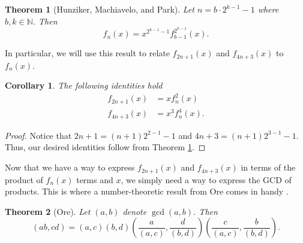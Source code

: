 \documentclass[a4paper]{article}
\newtheorem{theorem}{Theorem}
\newtheorem{corollary}{Corollary}
\newcommand{\N}{\mathbb{N}}
\begin{document}
	\begin{theorem}[Hunziker, Machiavelo, and Park]\label{HMP_identity}
		Let $n = b\cdot2^{k-1} - 1$ where $b, k \in \N$.
		Then
		\begin{equation*}
			f_n(x) = x^{2^{k-1}-1} f_{b-1}^{2^{k-1}}(x).
		\end{equation*}
	\end{theorem}

	In particular, we will use this result to relate $f_{2n+1}(x)$ and $f_{4n+3}(x)$ to $f_n(x)$.
	\begin{corollary}\label{cor1}
		The following identities hold
		\begin{align*}
			f_{2n+1}(x) &= xf_{n}^2(x) \\
			f_{4n+3}(x) &= x^3f_{n}^4(x).
		\end{align*}
	\end{corollary}
	\begin{proof}
		Notice that $2n+1 = (n+1)2^{2-1} - 1$ and $4n+3 = (n+1)2^{3-1} - 1$.
		Thus, our desired identities follow from Theorem \ref{HMP_identity}.
	\end{proof}

	Now that we have a way to express $f_{2n+1}(x)$ and $f_{4n+3}(x)$ in terms of the product of $f_{n}(x)$ terms and $x$, we simply need a way to express the GCD of products.
	This is where a number-theoretic result from Ore comes in handy \cite{ore_number_theory}.
	
	\begin{theorem}[Ore]\label{Ore_gcd}
		Let $(a,b)$ denote $\gcd{(a,b)}$.
		Then
		\begin{equation*}
			(ab,cd) = (a,c)(b,d)\left(\frac{a}{(a,c)},\frac{d}{(b,d)}\right)\left(\frac{c}{(a,c)},\frac{b}{(b,d)}\right).
		\end{equation*}
	\end{theorem}
\end{document}
